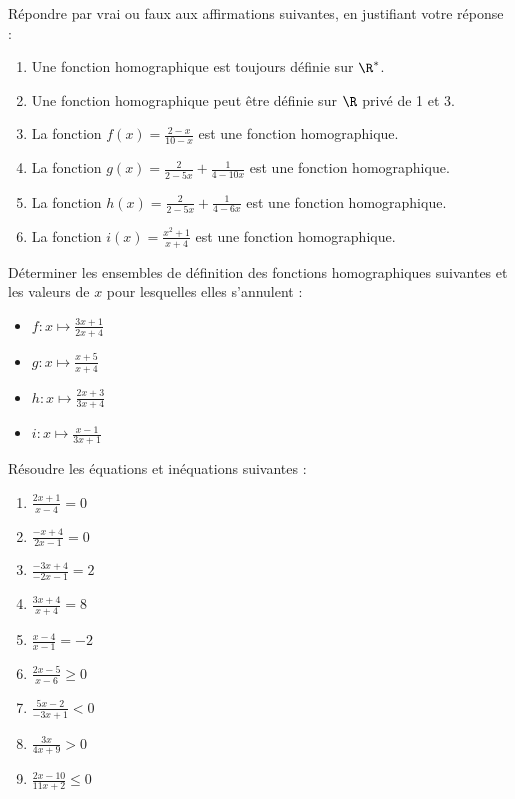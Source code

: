 \begin{exo}
R\'epondre par vrai ou faux aux affirmations suivantes, en justifiant votre r\'eponse :
\begin{enumerate}
 \item Une fonction homographique est toujours d\'efinie sur $\R^*$.
 \item Une fonction homographique peut \^etre d\'efinie sur $\R$ priv\'e de 1 et 3.
 \item La fonction $f(x)=\frac{2-x}{10-x}$ est une fonction homographique.
 \item La fonction $g(x)=\frac{2}{2-5x}+\frac{1}{4-10x}$ est une fonction homographique.
 \item La fonction $h(x)=\frac{2}{2-5x}+\frac{1}{4-6x}$ est une fonction homographique.
 \item La fonction $i(x)=\frac{x^2+1}{x+4}$ est une fonction homographique.
\end{enumerate}
\end{exo}


\begin{exo}
D\'eterminer les ensembles de d\'efinition des fonctions homographiques suivantes et les valeurs de $x$ pour lesquelles elles s'annulent :
\vspace{-1em}\begin{multicols}{4}\begin{itemize}
 \item $f:x\longmapsto \frac{3x+1}{2x+4}$
 \item $g:x\longmapsto \frac{x+5}{x+4}$
 \item $h:x\longmapsto \frac{2x+3}{3x+4}$
 \item $i:x\longmapsto \frac{x-1}{3x+1}$
\end{itemize}\end{multicols}\vspace{-1em}
\end{exo}

\begin{exo}
R\'esoudre les \'equations et in\'equations suivantes :
\vspace{-1em}\begin{multicols}{3}\begin{enumerate}
 \item $\frac{2x+1}{x-4}=0$
 \item $\frac{-x+4}{2x-1}=0$
 \item $\frac{-3x+4}{-2x-1}=2$
 \item $\frac{3x+4}{x+4}=8$
 \item $\frac{x-4}{x-1}=-2$
 \item $\frac{2x-5}{x-6}\geqslant0$
 \item $\frac{5x-2}{-3x+1}<0$
 \item $\frac{3x}{4x+9}>0$
 \item $\frac{2x-10}{11x+2}\leqslant0$
\end{enumerate}\end{multicols}\vspace{-1em}
\end{exo}

